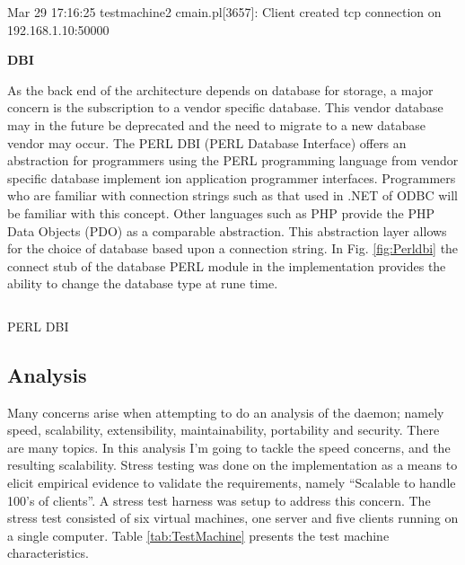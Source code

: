 		\vspace{5mm}
		\normalsize
		{
			Mar 29 17:16:25 testmachine2 cmain.pl[3657]: Client created tcp connection on 192.168.1.10:50000
			\newline
		}
						
		\large{\bfseries{DBI}}	
		
		\normalsize
		{					
			As the back end of the architecture depends on database for storage, a major concern is the subscription to a vendor specific database.
			This vendor database may in the future be deprecated and the need to migrate to a new database vendor may occur.
			The PERL DBI (PERL Database Interface) offers an abstraction for programmers using the PERL programming language from vendor specific
			database implement ion application programmer interfaces.  Programmers who are familiar with connection strings such as that used in .NET of ODBC will be 
			familiar with this concept.  Other languages such as PHP provide the PHP Data Objects (PDO) as a comparable abstraction.  
			This abstraction layer allows for the choice of database based upon a connection string.
			In Fig. \ref{fig:Perldbi} the connect stub of the database PERL module in the implementation provides the ability to change the database type
			at rune time.
		}
		
		\vspace{2mm}
		\begin{figurehere}
			\inputminted[linenos=true,fontsize=\footnotesize,tabsize=2]{perl}{pages/chapter3/smippets/dbi.pl}
			\vspace{-2mm}
			\caption{PERL DBI}
			\label{fig:Perldbi}
		\end{figurehere}	 
		
\newpage
	
	\subsection{Analysis}
	
		\normalsize
		{					
			Many concerns arise when attempting to do an analysis of the daemon; namely speed, scalability, extensibility, maintainability, 
			portability and security.  There are many topics.  In this analysis I'm going to tackle the speed concerns, and the resulting scalability. 
			\newline
			\newline
			Stress testing was done on the implementation as a means to elicit empirical evidence to validate the requirements, namely
			``Scalable to handle 100's of clients''.  A stress test harness was setup to address this concern.  The stress test consisted of six virtual machines, 
			one server and five clients running on a single computer.	Table \ref{tab:TestMachine} presents the test machine characteristics.
			\newline
		}
		
